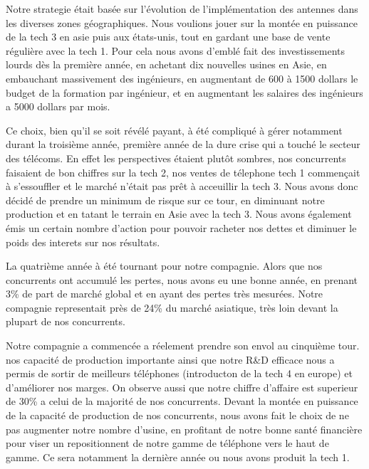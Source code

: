 Notre strategie était basée sur l'évolution de l'implémentation des
antennes dans les diverses zones géographiques. Nous voulions jouer
sur la montée en puissance de la tech 3 en asie puis aux états-unis,
tout en gardant une base de vente régulière avec la tech 1. Pour cela
nous avons d'emblé fait des investissements lourds dès la première
année, en achetant dix nouvelles usines en Asie, en embauchant
massivement des ingénieurs, en augmentant de 600 à 1500 dollars le
budget de la formation par ingénieur, et en augmentant les salaires
des ingénieurs a 5000 dollars par mois.


Ce choix, bien qu'il se soit révélé payant, à été compliqué à gérer
notamment durant la troisième année, première année de la dure crise
qui a touché le secteur des télécoms. En effet les perspectives
étaient plutôt sombres, nos concurrents faisaient de bon chiffres sur
la tech 2, nos ventes de télephone tech 1 commençait à s'essouffler
et le marché n'était pas prêt à acceuillir la tech 3. Nous avons donc
décidé de prendre un minimum de risque sur ce tour, en diminuant notre
production et en tatant le terrain en Asie avec la tech 3. Nous avons également émis un certain nombre d'action pour pouvoir racheter nos dettes et diminuer le poids des interets sur nos résultats.


La quatrième année à été tournant pour notre compagnie. Alors que nos
concurrents ont accumulé les pertes, nous avons eu une bonne année, en
prenant 3\% de part de marché global et en ayant des pertes très
mesurées. Notre compagnie representait près de 24\% du marché
asiatique, très loin devant la plupart de nos concurrents.


Notre compagnie a commencée a réelement prendre son envol au cinquième tour. nos capacité de production importante ainsi que notre R\&D efficace nous a permis de sortir de meilleurs téléphones (introducton de la tech 4 en europe) et d'améliorer nos marges. On observe aussi que notre chiffre d'affaire est superieur de 30\% a celui de la majorité de nos concurrents. Devant la montée en puissance de la capacité de production de nos concurrents, nous avons fait le choix de ne pas augmenter notre nombre d'usine, en profitant de notre bonne santé financière pour viser un repositionnent de notre gamme de téléphone vers le haut de gamme. Ce sera notamment la dernière année ou nous avons produit la tech 1.

 

